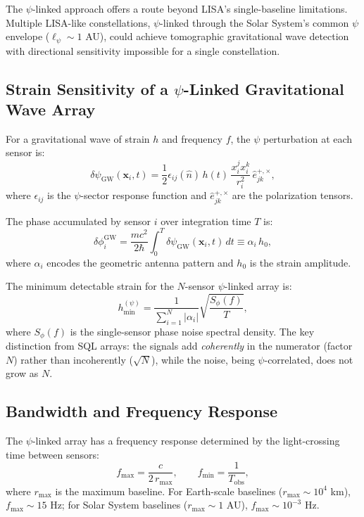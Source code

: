 \documentclass[12pt,a4paper]{article}
\theoremstyle{remark}
\begin{document}
The $\psi$-linked approach offers a route beyond LISA's single-baseline
limitations. Multiple LISA-like constellations, $\psi$-linked through the
Solar System's common $\psi$ envelope ($\ell_\psi \sim 1$ AU), could
achieve tomographic gravitational wave detection with directional
sensitivity impossible for a single constellation.

\subsection{Strain Sensitivity of a $\psi$-Linked Gravitational Wave Array}

For a gravitational wave of strain $h$ and frequency $f$, the $\psi$
perturbation at each sensor is:
\begin{equation}
\delta\psi_{\text{GW}}(\mathbf{x}_i, t) = \frac{1}{2}\epsilon_{ij}(\hat{n})\,h(t)\,
\frac{x_i^j x_i^k}{r_i^2}\,\hat{e}_{jk}^{+,\times},
\label{eq:gw-psi-perturbation}
\end{equation}
where $\epsilon_{ij}$ is the $\psi$-sector response function and
$\hat{e}_{jk}^{+,\times}$ are the polarization tensors.

The phase accumulated by sensor $i$ over integration time $T$ is:
\begin{equation}
\delta\phi_i^{\text{GW}} = \frac{mc^2}{2\hbar}\int_0^T \delta\psi_{\text{GW}}(\mathbf{x}_i, t)\,dt
\equiv \alpha_i\,h_0,
\label{eq:gw-phase}
\end{equation}
where $\alpha_i$ encodes the geometric antenna pattern and $h_0$ is the
strain amplitude.

The minimum detectable strain for the $N$-sensor $\psi$-linked array is:
\begin{equation}
\boxed{h_{\min}^{(\psi)} = \frac{1}{\sum_{i=1}^N |\alpha_i|}\sqrt{\frac{S_\phi(f)}{T}}},
\label{eq:strain-sensitivity}
\end{equation}
where $S_\phi(f)$ is the single-sensor phase noise spectral density. The
key distinction from SQL arrays: the signals add \emph{coherently} in the
numerator (factor $N$) rather than incoherently ($\sqrt{N}$), while the
noise, being $\psi$-correlated, does not grow as $N$.

\subsection{Bandwidth and Frequency Response}\label{sec:bandwidth}

The $\psi$-linked array has a frequency response determined by the
light-crossing time between sensors:
\begin{equation}
f_{\max} = \frac{c}{2\,r_{\max}}, \qquad
f_{\min} = \frac{1}{T_{\text{obs}}},
\label{eq:freq-response}
\end{equation}
where $r_{\max}$ is the maximum baseline. For Earth-scale baselines
($r_{\max} \sim 10^4$ km), $f_{\max} \sim 15$ Hz; for Solar System
baselines ($r_{\max} \sim 1$ AU), $f_{\max} \sim 10^{-3}$ Hz.
\end{document}
